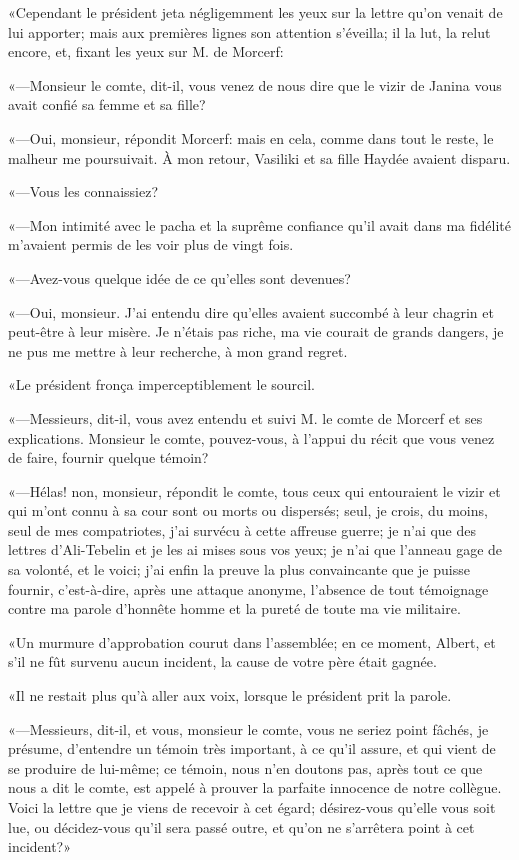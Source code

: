 «Cependant le président jeta négligemment les yeux sur la lettre qu'on venait de lui apporter; mais aux premières lignes son attention s'éveilla; il la lut, la relut encore, et, fixant les yeux sur M. de Morcerf: 

«—Monsieur le comte, dit-il, vous venez de nous dire que le vizir de Janina vous avait confié sa femme et sa fille? 

«—Oui, monsieur, répondit Morcerf: mais en cela, comme dans tout le reste, le malheur me poursuivait. À mon retour, Vasiliki et sa fille Haydée avaient disparu. 

«—Vous les connaissiez? 

«—Mon intimité avec le pacha et la suprême confiance qu'il avait dans ma fidélité m'avaient permis de les voir plus de vingt fois. 

«—Avez-vous quelque idée de ce qu'elles sont devenues? 

«—Oui, monsieur. J'ai entendu dire qu'elles avaient succombé à leur chagrin et peut-être à leur misère. Je n'étais pas riche, ma vie courait de grands dangers, je ne pus me mettre à leur recherche, à mon grand regret. 

«Le président fronça imperceptiblement le sourcil. 

«—Messieurs, dit-il, vous avez entendu et suivi M. le comte de Morcerf et ses explications. Monsieur le comte, pouvez-vous, à l'appui du récit que vous venez de faire, fournir quelque témoin? 

«—Hélas! non, monsieur, répondit le comte, tous ceux qui entouraient le vizir et qui m'ont connu à sa cour sont ou morts ou dispersés; seul, je crois, du moins, seul de mes compatriotes, j'ai survécu à cette affreuse guerre; je n'ai que des lettres d'Ali-Tebelin et je les ai mises sous vos yeux; je n'ai que l'anneau gage de sa volonté, et le voici; j'ai enfin la preuve la plus convaincante que je puisse fournir, c'est-à-dire, après une attaque anonyme, l'absence de tout témoignage contre ma parole d'honnête homme et la pureté de toute ma vie militaire. 

«Un murmure d'approbation courut dans l'assemblée; en ce moment, Albert, et s'il ne fût survenu aucun incident, la cause de votre père était gagnée. 

«Il ne restait plus qu'à aller aux voix, lorsque le président prit la parole. 

«—Messieurs, dit-il, et vous, monsieur le comte, vous ne seriez point fâchés, je présume, d'entendre un témoin très important, à ce qu'il assure, et qui vient de se produire de lui-même; ce témoin, nous n'en doutons pas, après tout ce que nous a dit le comte, est appelé à prouver la parfaite innocence de notre collègue. Voici la lettre que je viens de recevoir à cet égard; désirez-vous qu'elle vous soit lue, ou décidez-vous qu'il sera passé outre, et qu'on ne s'arrêtera point à cet incident?» 


